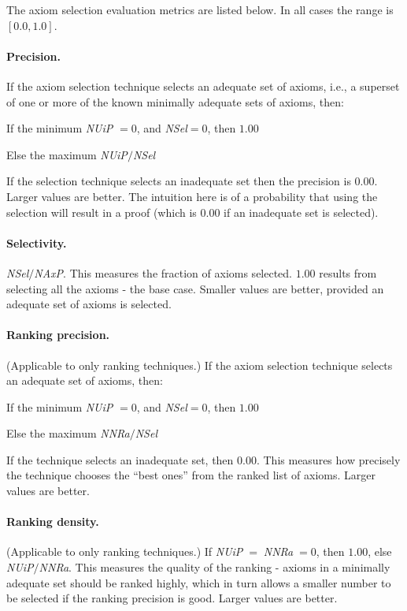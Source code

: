 \documentclass[EPiC]{easychair}
\newenvironment{packed_itemize}{
\vspace*{-0.5em}
\begin{itemize}
  \setlength{\partopsep}{0pt}
  \setlength{\itemsep}{1pt}
  \setlength{\parskip}{0pt}
  \setlength{\parsep}{0pt}
}{\end{itemize}}
\begin{document}
The axiom selection evaluation metrics are listed below.
In all cases the range is $[0.0,1.0]$.

\paragraph{Precision.}
If the axiom selection technique selects an adequate set of axioms, i.e., a 
superset of one or more of the known minimally adequate sets of axioms, then:
\begin{packed_itemize}
\item If the minimum \emph{NUiP} $= 0$, and \emph{NSel}$ = 0$, then $1.00$
\item Else the maximum \emph{NUiP}$/$\emph{NSel} 
\end{packed_itemize}
If the selection technique selects an inadequate set then the precision
is $0.00$.
Larger values are better.
The intuition here is of a probability that using the selection will result
in a proof (which is $0.00$ if an inadequate set is selected).

\paragraph{Selectivity.}
\emph{NSel}$/$\emph{NAxP}.
This measures the fraction of axioms selected.
$1.00$ results from selecting all the axioms - the base case.
Smaller values are better, provided an adequate set of axioms is selected.

\paragraph{Ranking precision.}
(Applicable to only ranking techniques.)
If the axiom selection technique selects an adequate set of axioms, then:
\begin{packed_itemize}
\item If the minimum \emph{NUiP} $= 0$, and \emph{NSel}$ = 0$, then $1.00$
\item Else the maximum \emph{NNRa}$/$\emph{NSel}
\end{packed_itemize}
If the technique selects an inadequate set, then $0.00$.
This measures how precisely the technique chooses the ``best ones'' from
the ranked list of axioms.
Larger values are better.

\paragraph{Ranking density.}
(Applicable to only ranking techniques.)
If \emph{NUiP}$\;=\;$\emph{NNRa}$\;= 0$, then $1.00$, else
\emph{NUiP}$/$\emph{NNRa}.
This measures the quality of the ranking - axioms in a minimally adequate 
set should be ranked highly, which in turn allows a smaller number to be 
selected if the ranking precision is good.
Larger values are better.
\end{document}
